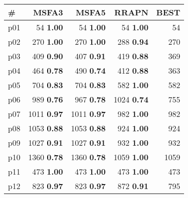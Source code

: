 \begin{tabular}{lrrrr}
\toprule
\textbf{\#} & \textbf{MSFA3} & \textbf{MSFA5} & \textbf{RRAPN} & \textbf{BEST}\\
\midrule
\multicolumn{1}{l|}{p01} & {\footnotesize 54} \textbf{1.00} & {\footnotesize 54} \textbf{1.00} & {\footnotesize 54} \textbf{1.00} & \multicolumn{1}{|r}{54}\\
\multicolumn{1}{l|}{p02} & {\footnotesize 270} \textbf{1.00} & {\footnotesize 270} \textbf{1.00} & {\footnotesize 288} \textbf{0.94} & \multicolumn{1}{|r}{270}\\
\multicolumn{1}{l|}{p03} & {\footnotesize 409} \textbf{0.90} & {\footnotesize 407} \textbf{0.91} & {\footnotesize 419} \textbf{0.88} & \multicolumn{1}{|r}{369}\\
\multicolumn{1}{l|}{p04} & {\footnotesize 464} \textbf{0.78} & {\footnotesize 490} \textbf{0.74} & {\footnotesize 412} \textbf{0.88} & \multicolumn{1}{|r}{363}\\
\multicolumn{1}{l|}{p05} & {\footnotesize 704} \textbf{0.83} & {\footnotesize 704} \textbf{0.83} & {\footnotesize 582} \textbf{1.00} & \multicolumn{1}{|r}{582}\\
\multicolumn{1}{l|}{p06} & {\footnotesize 989} \textbf{0.76} & {\footnotesize 967} \textbf{0.78} & {\footnotesize 1024} \textbf{0.74} & \multicolumn{1}{|r}{755}\\
\multicolumn{1}{l|}{p07} & {\footnotesize 1011} \textbf{0.97} & {\footnotesize 1011} \textbf{0.97} & {\footnotesize 982} \textbf{1.00} & \multicolumn{1}{|r}{982}\\
\multicolumn{1}{l|}{p08} & {\footnotesize 1053} \textbf{0.88} & {\footnotesize 1053} \textbf{0.88} & {\footnotesize 924} \textbf{1.00} & \multicolumn{1}{|r}{924}\\
\multicolumn{1}{l|}{p09} & {\footnotesize 1027} \textbf{0.91} & {\footnotesize 1027} \textbf{0.91} & {\footnotesize 932} \textbf{1.00} & \multicolumn{1}{|r}{932}\\
\multicolumn{1}{l|}{p10} & {\footnotesize 1360} \textbf{0.78} & {\footnotesize 1360} \textbf{0.78} & {\footnotesize 1059} \textbf{1.00} & \multicolumn{1}{|r}{1059}\\
\multicolumn{1}{l|}{p11} & {\footnotesize 473} \textbf{1.00} & {\footnotesize 473} \textbf{1.00} & {\footnotesize 473} \textbf{1.00} & \multicolumn{1}{|r}{473}\\
\multicolumn{1}{l|}{p12} & {\footnotesize 823} \textbf{0.97} & {\footnotesize 823} \textbf{0.97} & {\footnotesize 872} \textbf{0.91} & \multicolumn{1}{|r}{795}\\

\end{tabular}
